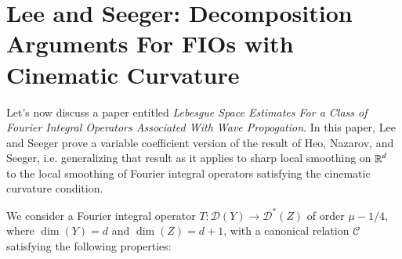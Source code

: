 \chapter[LS: Decomposition Arguments for FIOs with Cinematic Curvature]{Lee and Seeger: Decomposition Arguments For FIOs with Cinematic Curvature}

Let's now discuss a paper \cite{LeeSeeger} entitled \emph{Lebesgue Space Estimates For a Class of Fourier Integral Operators Associated With Wave Propogation}. In this paper, Lee and Seeger prove a variable coefficient version of the result of Heo, Nazarov, and Seeger, i.e. generalizing that result as it applies to sharp local smoothing on $\operatorname{\mathbb{R}}^d$ to the local smoothing of Fourier integral operators satisfying the cinematic curvature condition.

We consider a Fourier integral operator $T: \mathcal{D}(Y) \to \mathcal{D}^*(Z)$ of order $\mu - 1/4$, where $\dim(Y) = d$ and $\dim(Z) = d + 1$, with a canonical relation $\mathcal{C}$ satisfying the following properties:
%

